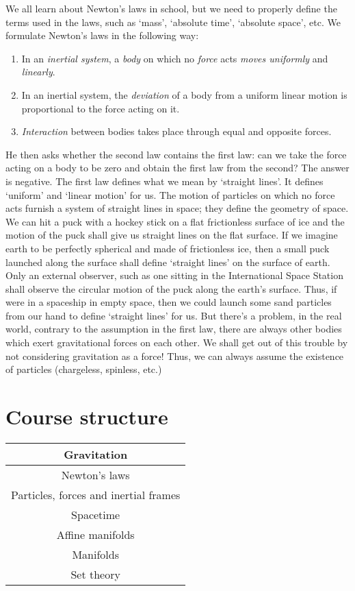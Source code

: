 \documentclass[a4 paper, oneside, 12pt]{book}
\theoremstyle{definition}
\begin{document}
	We all learn about Newton's laws in school, but we need to properly define the terms used in the laws, such as `mass', `absolute time', `absolute space', etc. We formulate Newton's laws in the following way:
	\begin{enumerate}
		\item In an \textit{inertial system}, a \textit{body} on which no \textit{force} acts \textit{moves uniformly} and \textit{linearly}.
		\item In an inertial system, the \textit{deviation} of a body from a uniform linear motion is proportional to the force acting on it.
		\item \textit{Interaction} between bodies takes place through equal and opposite forces.
	\end{enumerate}
	He then asks whether the second law contains the first law: can we take the force acting on a body to be zero and obtain the first law from the second? The answer is negative. The first law defines what we mean by `straight lines'. It defines `uniform' and `linear motion' for us. The motion of particles on which no force acts furnish a system of straight lines in space; they define the geometry of space. We  can hit a puck with a hockey stick on a flat frictionless surface of ice and the motion of the puck shall give us straight lines on the flat surface. If we imagine earth to be perfectly spherical and made of frictionless ice, then a small puck launched along the surface shall define `straight lines' on the surface of earth. Only an external observer, such as one sitting in the International Space Station shall observe the circular motion of the puck along the earth's surface. Thus, if were in a spaceship in empty space, then we could launch some sand particles from our hand to define `straight lines' for us. But there's a problem, in the real world, contrary to the assumption in the first law, there are always other bodies which exert gravitational forces on each other. We shall get out of this trouble by not considering gravitation as a force! Thus, we can always assume the existence of particles (chargeless, spinless, etc.)

	\section{Course structure}

	\begin{center}
		\begin{tabular}{|c|}
		    \hline
			Gravitation\\
			\hline
			Newton's laws\\
			\hline
			Particles, forces and inertial frames\\
			\hline
			Spacetime\\
			\hline
			Affine manifolds\\
			\hline
			Manifolds\\
			\hline
			Set theory\\
			\hline
		\end{tabular}
	\end{center}
\end{document}
